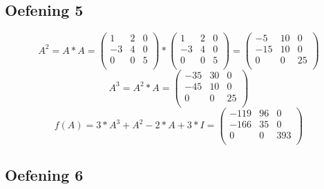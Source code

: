 \documentclass[lineaire_algebra_oplossingen.tex]{subfiles}
\begin{document}
\subsection{Oefening 5}
\[
   A^2 = A*A = \left( \begin{array}{ccc}
    1 & 2 & 0 \\
    -3 & 4 & 0 \\
    0 & 0 & 5 \\
  \end{array} \right) * \left( \begin{array}{ccc}
    1 & 2 & 0 \\
    -3 & 4 & 0 \\
    0 & 0 & 5 \\
  \end{array} \right) = \left( \begin{array}{ccc}
    -5 & 10 & 0 \\
    -15 & 10 & 0 \\
    0 & 0 & 25 \\
  \end{array} \right) 
  \]
\[ 
  A^3 = A^2 * A = \left( \begin{array}{ccc}
    -35 & 30 & 0 \\
    -45 & 10 & 0 \\
    0 & 0 & 25 \\
  \end{array} \right)
\]
\[
f(A) = 3*A^3 + A^2 - 2*A + 3*I =  \left( \begin{array}{ccc}
    -119 & 96 & 0 \\
    -166 & 35 & 0 \\
    0 & 0 & 393 \\
  \end{array} \right)
\]
\subsection{Oefening 6}
\end{document}

